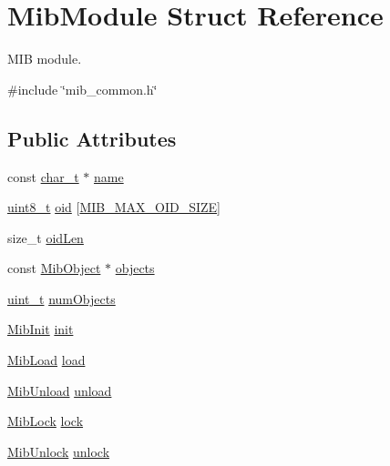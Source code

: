 \hypertarget{structMibModule}{}\section{Mib\+Module Struct Reference}
\label{structMibModule}


M\+IB module.  




{\ttfamily \#include \char`\"{}mib\+\_\+common.\+h\char`\"{}}

\subsection*{Public Attributes}
\begin{DoxyCompactItemize}
\item 
const \hyperlink{compiler__port_8h_a40bb5262bf908c328fbcfbe5d29d0201}{char\+\_\+t} $\ast$ \hyperlink{structMibModule_a2f457893adfb6a6711ac75cbaa55c9b1}{name}
\item 
\hyperlink{stdint_8h_aba7bc1797add20fe3efdf37ced1182c5}{uint8\+\_\+t} \hyperlink{structMibModule_af5a55e711701cdec4f0cb9edc7c2b5a4}{oid} \mbox{[}\hyperlink{mib__common_8h_a70ab69e5198d8438346981c7b26dabca}{M\+I\+B\+\_\+\+M\+A\+X\+\_\+\+O\+I\+D\+\_\+\+S\+I\+ZE}\mbox{]}
\item 
size\+\_\+t \hyperlink{structMibModule_ae4a7638d531b2257272e960d175d53fb}{oid\+Len}
\item 
const \hyperlink{mib__common_8h_a2bc33cee6dd90a0ee8eeb92976a1c479}{Mib\+Object} $\ast$ \hyperlink{structMibModule_ab77b76e01f954ed88084409a966352aa}{objects}
\item 
\hyperlink{compiler__port_8h_a12a1e9b3ce141648783a82445d02b58d}{uint\+\_\+t} \hyperlink{structMibModule_ab9594c4a682ecd9c16c0986307dce4b3}{num\+Objects}
\item 
\hyperlink{mib__common_8h_aff33708fc9095fa6f4b07e83b3e3296f}{Mib\+Init} \hyperlink{structMibModule_ae58f1679aef20da90eb1ed4240f04f37}{init}
\item 
\hyperlink{mib__common_8h_ab9c66331b8c2f51d4a41907905069339}{Mib\+Load} \hyperlink{structMibModule_a01077b888aea380f8d383a992aea0efa}{load}
\item 
\hyperlink{mib__common_8h_a9d19b7401e8455aa458ac4c1e36eecef}{Mib\+Unload} \hyperlink{structMibModule_ad724f3fb653cd8e9020156944c24abdf}{unload}
\item 
\hyperlink{mib__common_8h_a7c0490582ba39a77cc6c647c5260adb3}{Mib\+Lock} \hyperlink{structMibModule_a261fb38e912ea09684b79450e432d1d7}{lock}
\item 
\hyperlink{mib__common_8h_ac8e536d17319d4b55310bdaec621a22e}{Mib\+Unlock} \hyperlink{structMibModule_a588b8e3a01eb04010cdd8c463d4ed9a3}{unlock}
\end{DoxyCompactItemize}


